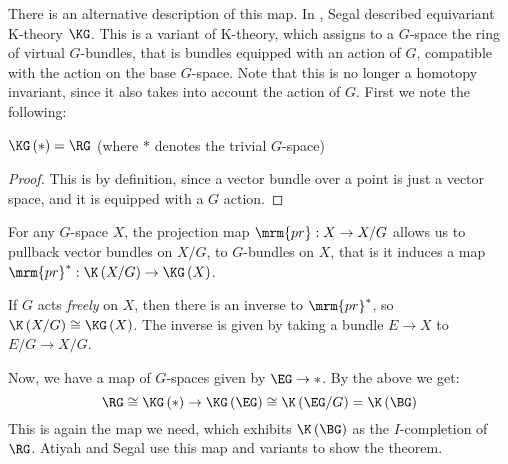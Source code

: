There is an alternative description of this map.
In \cite{Seg}, Segal described equivariant K-theory $\KG$.
This is a variant of K-theory, which assigns to a $G$-space the ring of virtual $G$-bundles, that is bundles equipped with an action of $G$, compatible with the action on the base $G$-space.
Note that this is no longer a homotopy invariant, since it also takes into account the action of $G$.
First we note the following:

\begin{proposition}
	$\KG\left(*\right) = \RG$ (where $*$ denotes the trivial $G$-space)
\end{proposition}

\begin{proof}
	This is by definition, since a vector bundle over a point is just a vector space, and it is equipped with a $G$ action.
\end{proof}

For any $G$-space $X$, the projection map $\mrm{pr}: X \to X/G$ allows us to pullback vector bundles on $X/G$, to $G$-bundles on $X$, that is it induces a map $\mrm{pr}^*: \K\left(X/G\right) \to \KG\left(X\right)$.

\begin{proposition}
	If $G$ acts \emph{freely} on $X$, then there is an inverse to $\mrm{pr}^*$, so $\K\left(X/G\right) \cong \KG\left(X\right)$.
	The inverse is given by taking a bundle $E \to X$ to $E/G \to X/G$.
\end{proposition}

Now, we have a map of $G$-spaces given by $\EG \to *$.
By the above we get:
$$
\RG
\cong \KG\left(*\right)
\to \KG\left(\EG\right)
\cong \K\left(\EG/G\right)
= \K\left(\BG\right)
$$
This is again the map we need, which exhibits $\K\left(\BG\right)$ as the $I$-completion of $\RG$.
Atiyah and Segal use this map and variants to show the theorem.
